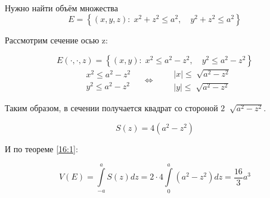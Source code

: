\documentclass[../main.tex]{subfiles}
\begin{document}
\begin{example}

    ~

    Нужно найти объём множества
    \[ E=\left\{ \left( x,y,z\right):\;x^2+z^2 \leq a^2,\quad y^2+z^2 \leq a^2\right\}\]

    Рассмотрим сечение осью z:

    \[ E\left( \cdot,\cdot,z\right)=\left\{ \left( x, y\right):\;x^2 \leq a^2-z^2,\quad y^2 \leq a^2-z^2\right\}\]
    \begin{equation*}
        \begin{aligned}
            &x^2 \leq a^2-z^2\\
            &y^2 \leq a^2-z^2
        \end{aligned}
       \quad\Longleftrightarrow\quad 
       \begin{aligned}
            &\left| x\right| \leq \sqrt[]{a^2-z^2}\\
            &\left| y\right| \leq \sqrt[]{a^2-z^2}
       \end{aligned}
    \end{equation*}

    Таким образом, в сечении получается квадрат со стороной \( 2\;\sqrt[]{a^2-z^2}\). 

    \[ S\left( z\right)=4\left( a^2-z^2\right)\]

    И по теореме \ref{16:1}:

    \[ V\left( E\right)= \displaystyle\int\limits_{ -a}^{ a} S\left( z\right)dz=2\cdot4 \displaystyle\int\limits_{ 0}^{ a} \left( a^2-z^2\right)dz= \dfrac{ 16}{ 3}a^3\]
\end{example}
\end{document}
